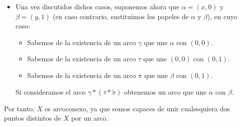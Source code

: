 \begin{ejercicio}
\begin{itemize}
\begin{equation*}
\begin{array}{cl}
                \end{array}\right.
            \end{equation*}
        \item Una vez discutidos dichos casos, suponemos ahora que $\alpha=(x,0)$ y $\beta = (y,1)$ (en caso contrario, sustituimos los papeles de $\alpha$ y $\beta$), en cuyo caso:
            \begin{itemize}
                \item Sabemos de la existencia de un arco $\gamma$ que une $\alpha$ con $(0,0)$.
                \item Sabemos de la existencia de un arco $\tau$ que une $(0,0)$ con $(0,1)$.
                \item Sabemos de la existencia de un arco $\pi$ que une $\beta$ con $(0,1)$.
            \end{itemize}
            Si consideramos el arco $\gamma \ast (\tau \ast \tilde{\pi})$ obtenemos un arco que une $\alpha$ con $\beta$.
    \end{itemize} 
    Por tanto, $X$ es arcoconexo, ya que somos capaces de unir cualesquiera dos puntos distintos de $X$ por un arco.\\


\end{ejercicio}
